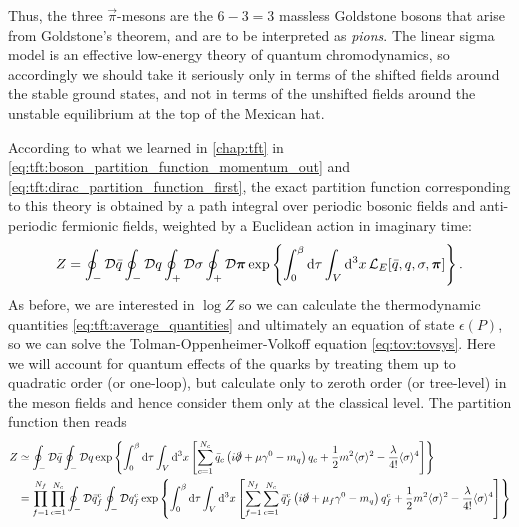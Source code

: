 Thus, the three $\vec\pi$-mesons are the $6 - 3 = 3$ massless Goldstone bosons that arise from Goldstone's theorem, and are to be interpreted as \emph{pions}.
The linear sigma model is an effective low-energy theory of quantum chromodynamics, so accordingly we should take it seriously only in terms of the shifted fields around the stable ground states, and not in terms of the unshifted fields around the unstable equilibrium at the top of the Mexican hat.

According to what we learned in \cref{chap:tft} in \cref{eq:tft:boson_partition_function_momentum_out} and \eqref{eq:tft:dirac_partition_function_first},
the exact partition function corresponding to this theory is obtained by a path integral over periodic bosonic fields and anti-periodic fermionic fields, weighted by a Euclidean action in imaginary time:
\begin{equation}
	Z = \oint_- \mathcal{D} \bar{q} \oint_- \mathcal{D} q \oint_+ \mathcal{D} \sigma \oint_+ \mathcal{D} {\bm{\pi}} \exp \left\{ \int_0^\beta \mathop{}\!\mathrm{d} \tau \int_V \mathop{}\!\mathrm{d}^3 x \, \mathcal{L}_E[\bar{q}, q, \sigma, {\bm{\pi}}]  \right\} .
\end{equation}
As before, we are interested in $\log Z$ so we can calculate the thermodynamic quantities \eqref{eq:tft:average_quantities} and ultimately an equation of state $\epsilon(P)$, so we can solve the Tolman-Oppenheimer-Volkoff equation \eqref{eq:tov:tovsys}.
Here we will account for quantum effects of the quarks by treating them up to quadratic order (or one-loop),
but calculate only to zeroth order (or tree-level) in the meson fields and hence consider them only at the classical level.
The partition function then reads
\begin{equation}
\begin{split}
	Z &\simeq \oint_- \mathcal{D} \bar{q} \oint_- \mathcal{D} q \exp \left\{ \int_0^{\beta} \mathop{}\!\mathrm{d} \tau \int_V \mathop{}\!\mathrm{d}^3 x \left[ \sum_{c=1}^{N_c} \bar{q}_c \left( i \slashed\partial + \mu \gamma^0 - m_q \right) q_c + \frac12 m^2 \langle \sigma \rangle^2 - \frac{\lambda}{4!} \langle \sigma \rangle^4 \right] \right\} \\
	  &=       \prod_{f=1}^{N_f} \prod_{c=1}^{N_c} \oint_- \mathcal{D} \bar{q}_f^c \oint_- \mathcal{D} q_f^c \exp \left\{ \int_0^{\beta} \mathop{}\!\mathrm{d} \tau \int_V \mathop{}\!\mathrm{d}^3 x \left[ \sum_{f=1}^{N_f} \sum_{c=1}^{N_c} \bar{q}_f^c \left( i \slashed\partial + \mu_f \gamma^0 - m_q \right) q_f^c + \frac12 m^2 \langle \sigma \rangle^2 - \frac{\lambda}{4!} \langle \sigma \rangle^4 \right] \right\} \\
\end{split}
\end{equation}
